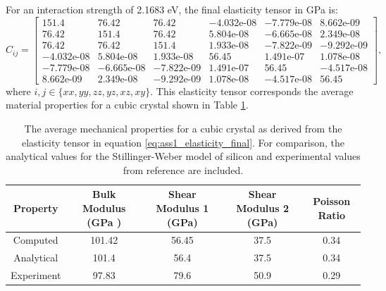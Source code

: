 \documentclass[10pt,a4paper]{labreport}
\begin{document}
For an interaction strength of 2.1683 eV, the final elasticity tensor in GPa is:
\begin{equation}
  C_{ij} = \left[
  \begin{array}{llllll}
         151.4        &      76.42        &      76.42        & -4.032\text{e-}08 & -7.779\text{e-}08 &  8.662\text{e-}09 \\ 
     76.42            &      151.4        &      76.42        &  5.804\text{e-}08 & -6.665\text{e-}08 &  2.349\text{e-}08 \\ 
     76.42            &      76.42        &      151.4        &  1.933\text{e-}08 & -7.822\text{e-}09 & -9.292\text{e-}09 \\ 
-4.032\text{e-}08     &  5.804\text{e-}08 &  1.933\text{e-}08 &      56.45        &  1.491\text{e-}07 &  1.078\text{e-}08 \\ 
-7.779\text{e-}08     & -6.665\text{e-}08 & -7.822\text{e-}09 &  1.491\text{e-}07 &      56.45        & -4.517\text{e-}08 \\ 
 8.662\text{e-}09     &  2.349\text{e-}08 & -9.292\text{e-}09 &  1.078\text{e-}08 & -4.517\text{e-}08 &      56.45 
  \end{array}
   \right],
   \label{eq:ass1_elasticity_final}
\end{equation}
where $i,j \in \{xx, yy, zz, yz, xz, xy\}$. This elasticity tensor corresponds the average material properties for a cubic crystal shown in Table \ref{tab:ass1_mechprops}.
\begin{table}[h]
  \centering
  \caption{The average mechanical properties for a cubic crystal as derived from the elasticity tensor in equation \eqref{eq:ass1_elasticity_final}. For comparison, the analytical values for the  Stillinger-Weber model of silicon and experimental values from reference \cite{cowleyLatticeDynamicsSilicon1988} are included. }
  \begin{tabular}{ccccc } \hline 
    Property & Bulk Modulus (GPa ) & Shear Modulus 1 (GPa) & Shear Modulus 2 (GPa) & Poisson Ratio \\ \hline
    Computed & 101.42 & 56.45 & 37.5 & 0.34 \\
    Analytical & 101.4 & 56.4 & 37.5 & 0.34 \\ 
    Experiment & 97.83 & 79.6 & 50.9 & 0.29 \\
    \hline 
  \end{tabular}
  \label{tab:ass1_mechprops}
\end{table}

\newpage
\end{document}
